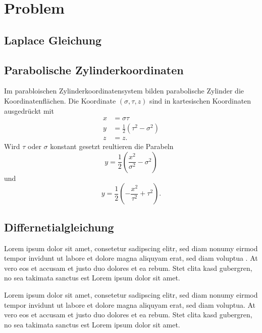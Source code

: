 %
%
%
\section{Problem\label{parzyl:section:teil0}}

\subsection{Laplace Gleichung}

\subsection{Parabolische Zylinderkoordinaten
\label{parzyl:subsection:finibus}}
Im parabloischen Zylinderkoordinatensystem bilden parabolische Zylinder die Koordinatenflächen.
Die Koordinate $(\sigma, \tau, z)$ sind in kartesischen Koordinaten ausgedrückt mit
\begin{align}
    x & = \sigma \tau \\
    y & = \frac{1}{2}\left(\tau^2 - \sigma^2\right) \\
    z & = z.
\end{align}
Wird $\tau$ oder $\sigma$ konstant gesetzt reultieren die Parabeln
\begin{equation}
    y = \frac{1}{2} \left( \frac{x^2}{\sigma^2} - \sigma^2 \right)
\end{equation}
und 
\begin{equation}
    y = \frac{1}{2} \left( -\frac{x^2}{\tau^2} + \tau^2 \right).
\end{equation}

\subsection{Differnetialgleichung}
Lorem ipsum dolor sit amet, consetetur sadipscing elitr, sed diam
nonumy eirmod tempor invidunt ut labore et dolore magna aliquyam
erat, sed diam voluptua \cite{parzyl:bibtex}.
At vero eos et accusam et justo duo dolores et ea rebum.
Stet clita kasd gubergren, no sea takimata sanctus est Lorem ipsum
dolor sit amet.

Lorem ipsum dolor sit amet, consetetur sadipscing elitr, sed diam
nonumy eirmod tempor invidunt ut labore et dolore magna aliquyam
erat, sed diam voluptua.
At vero eos et accusam et justo duo dolores et ea rebum.  Stet clita
kasd gubergren, no sea takimata sanctus est Lorem ipsum dolor sit
amet.


